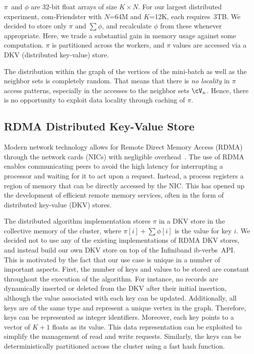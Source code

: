 $\pi$~and $\phi$ are 32-bit float arrays of size $K \times N$. For our
largest distributed experiment, com-Friendster with $N$=64M and $K$=12K, each
requires~3TB. We decided to store only $\pi$ and $\sum\phi$, and recalculate
$\phi$ from these whenever appropriate. Here, we trade a substantial gain
in memory usage against some computation. $\pi$ is partitioned across the workers,
and $\pi$ values are accessed via a DKV (distributed key-value) store.


The distribution within the graph of the vertices of the mini-batch as well as
the neighbor sets is completely random. That means that there is \textit{no
locality}
in $\pi$ access patterns, especially in the accesses to the neighbor sets
$\Neighbors$.
Hence, there is no opportunity to exploit data locality through caching of
$\pi$.

\subsection{RDMA Distributed Key-Value Store}

Modern network technology allows for Remote Direct Memory Access (RDMA)
through the network cards (NICs) with negligible
overhead~\cite{Hamada_infinibandtrade,Beck:2011:PER:2043535.2043537}. The use
of RDMA enables communicating peers to avoid the high latency for
interrupting a processor and waiting for it to act upon a request. Instead, a
process registers a region of memory that can be directly accessed by the
NIC. %
This has opened up the development of
efficient remote memory services, often in the form of distributed key-value
(DKV) stores.

The distributed algorithm implementation stores $\pi$ in a DKV store in the
collective memory of the
cluster, where $\pi[i]+\sum\phi[i]$ is the value for key $i$.
%
We decided not
to use any of the existing implementations of RDMA DKV stores, and instead
build our own DKV store on top of the Infiniband ib-verbs~API.
%
This is motivated by the fact that our use case is unique in a number
of important aspects. First, the number of keys and values to be stored are
constant throughout the execution of the algorithm. For instance, no records
are dynamically inserted or deleted from the DKV after their initial insertion,
although the value associated with each key can be updated. Additionally, all
keys are of the same type and represent a unique vertex in the graph.
Therefore, keys can be represented as integer identifiers. Moreover, each key
points to a vector of $K+1$ floats as its value.
%
This data representation can be exploited to simplify the management of
read and write requests. Similarly, the keys can be deterministically
partitioned across the cluster using a fast hash function.

